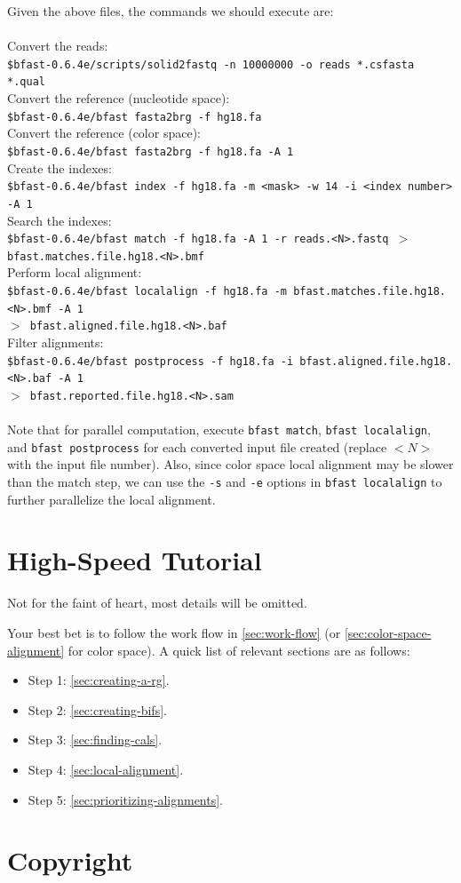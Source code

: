 \documentclass[a4paper,12pt]{book}
\newcommand{\Version}{0.6.4e}
\newcommand{\TT}[1]{{\tt #1}} %
\begin{document}
Given the above files, the commands we should execute are:
\\\\
Convert the reads:\\
{\tt \scriptsize \$bfast-\Version{}/scripts/solid2fastq -n 10000000 -o reads *.csfasta *.qual\\}
Convert the reference (nucleotide space):\\
{\tt \scriptsize \$bfast-\Version{}/bfast fasta2brg -f hg18.fa\\}
Convert the reference (color space):\\
{\tt \scriptsize \$bfast-\Version{}/bfast fasta2brg -f hg18.fa -A 1 \\}
Create the indexes:\\
{\tt \scriptsize \$bfast-\Version{}/bfast index -f hg18.fa -m <mask> -w 14 -i <index number> -A 1\\}
Search the indexes:\\
{\tt \scriptsize \$bfast-\Version{}/bfast match -f hg18.fa -A 1 -r reads.<N>.fastq $>$ bfast.matches.file.hg18.<N>.bmf\\}
Perform local alignment:\\
{\tt \scriptsize \$bfast-\Version{}/bfast localalign -f hg18.fa -m bfast.matches.file.hg18.<N>.bmf -A 1\\
$>$ bfast.aligned.file.hg18.<N>.baf\\}
Filter alignments:\\
{\tt \scriptsize \$bfast-\Version{}/bfast postprocess -f hg18.fa -i bfast.aligned.file.hg18.<N>.baf -A 1\\
$>$ bfast.reported.file.hg18.<N>.sam\\}
\\
Note that for parallel computation, execute {\tt bfast match}, {\tt bfast localalign}, and {\tt bfast postprocess} for each converted input file created (replace $<N>$ with the input file number).
Also, since color space local alignment may be slower than the match step, we can use the \TT{-s} and \TT{-e} options in {\tt bfast localalign} to further parallelize the local alignment.

\section{High-Speed Tutorial}
\label{sec:high-speed-tutorial}
Not for the faint of heart, most details will be omitted.

Your best bet is to follow the work flow in \autoref{sec:work-flow} (or \autoref{sec:color-space-alignment} for color space).
A quick list of relevant sections are as follows:
\begin{itemize}
	\item Step 1: \autoref{sec:creating-a-rg}.
	\item Step 2: \autoref{sec:creating-bifs}.
	\item Step 3: \autoref{sec:finding-cals}.
	\item Step 4: \autoref{sec:local-alignment}.
	\item Step 5: \autoref{sec:prioritizing-alignments}.
\end{itemize}
\section{Copyright}


{}


\end{document}
